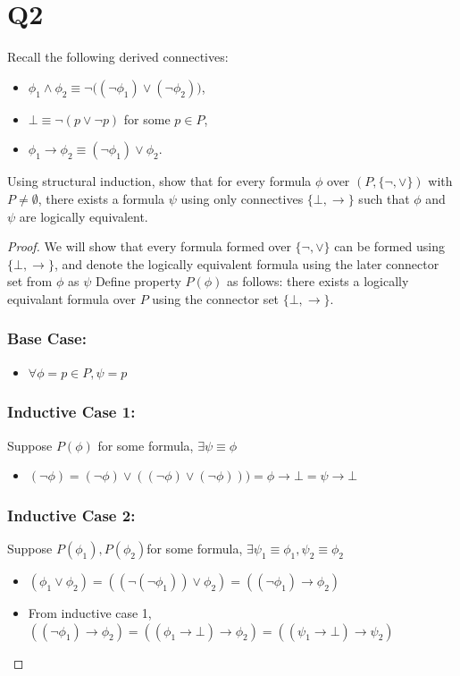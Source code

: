 \documentclass{article}
\begin{document}
\section*{Q2}
Recall the following derived connectives:
\begin{itemize}
  \item $\phi_1 \wedge \phi_2 \equiv \neg\bigl((\neg \phi_1)\vee(\neg \phi_2)\bigr)$,
  \item $\bot \equiv \neg(p \vee \neg p)$ for some $p\in P$,
  \item $\phi_1 \to \phi_2 \equiv (\neg \phi_1)\vee \phi_2$.
\end{itemize}
Using structural induction, show that for every formula $\phi$ over $(P,\{\neg,\vee\})$
with $P\neq\emptyset$, there exists a formula $\psi$ using only connectives
$\{\bot,\to\}$ such that $\phi$ and $\psi$ are logically equivalent.
\begin{proof}
    We will show that every formula formed over $\{\neg, \lor\}$ can be formed using $\{\bot, \rightarrow\}$, 
    and denote the logically equivalent formula using the later connector set from $\phi$ as $\psi$
    Define property $P(\phi)$ as follows: there exists a logically equivalant formula over $P$ using the connector set $\{\bot, \rightarrow\}$.
    \subsubsection*{Base Case:}
    \begin{itemize}
        \item $\forall \phi = p \in P, \psi = p$
    \end{itemize}
    \subsubsection*{Inductive Case 1:} Suppose $P(\phi)$ for some formula, $\exists \psi \equiv \phi$
    \begin{itemize}
        \item $(\neg \phi) = (\neg \phi) \lor ((\neg \phi) \lor (\neg \phi))) = \phi \rightarrow \bot = \psi \rightarrow \bot$ 
    \end{itemize}
    \subsubsection*{Inductive Case 2:}Suppose $P(\phi_1), P(\phi_2)$for some formula, $\exists \psi_1 \equiv \phi_1, \psi_2 \equiv \phi_2$
    \begin{itemize}
        \item $(\phi_1 \lor \phi_2) = ((\neg (\neg \phi_1)) \lor \phi_2) = ((\neg \phi_1) \rightarrow \phi_2)$
        \item From inductive case 1, $((\neg \phi_1) \rightarrow \phi_2) = ((\phi_1 \rightarrow \bot) \rightarrow \phi_2) = ((\psi_1 \rightarrow \bot) \rightarrow \psi_2)$
    \end{itemize}

\end{proof}
\end{document}
